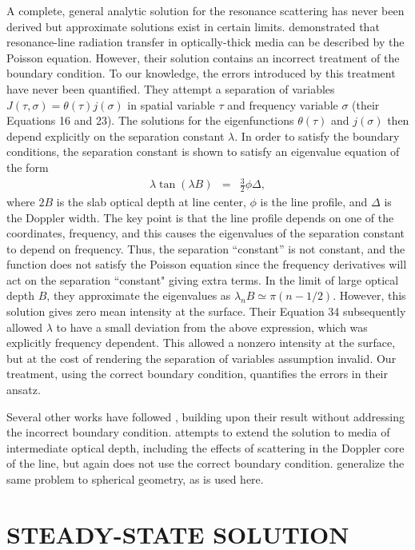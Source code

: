 \documentclass{aastex63}
\newcommand{\be}{\begin{eqnarray}}
\newcommand{\ee}{\end{eqnarray}}
\begin{document}
A complete, general analytic solution for the resonance scattering has never been derived but approximate solutions exist in certain limits. \citet{1973MNRAS.162...43H} demonstrated that resonance-line radiation transfer in optically-thick media can be described by the Poisson equation. However, their solution contains an incorrect treatment of the boundary condition. To our knowledge, the errors introduced by this treatment have never been quantified. They attempt a separation of variables $J(\tau,\sigma) = \theta(\tau) j(\sigma)$ in spatial variable $\tau$ and frequency variable $\sigma$ (their Equations 16 and 23). The solutions for the eigenfunctions $\theta(\tau)$ and $j(\sigma)$ then depend explicitly on the separation constant $\lambda$. In order to satisfy the boundary conditions, the separation constant is shown to satisfy an eigenvalue equation of the form
\be
\lambda \tan(\lambda B) & = & \frac{3}{2} \phi \Delta,
\label{eq:evalue}
\ee
where $2B$ is the slab optical depth at line center, $\phi$ is the line profile, and $\Delta$ is the Doppler width. The key point is that the line profile depends on one of the coordinates, frequency, and this causes the eigenvalues of the separation constant to depend on frequency. Thus, the separation ``constant'' is not constant, and the function does not satisfy the Poisson equation since the frequency derivatives will act on the separation ``constant" giving extra terms. In the limit of large optical depth $B$, they approximate the eigenvalues as $\lambda_n B \simeq \pi (n-1/2)$. However, this solution gives zero mean intensity at the surface. Their Equation 34 subsequently allowed $\lambda$ to have a small deviation from the above expression, which was explicitly frequency dependent. This allowed a nonzero intensity at the surface, but at the cost of rendering the separation of variables assumption invalid. Our treatment, using the correct boundary condition, quantifies the errors in their ansatz.

Several other works have followed \citet{1973MNRAS.162...43H}, building upon their result without addressing the incorrect boundary condition. \citet{1990ApJ...350..216N} attempts to extend the solution to media of intermediate optical depth, including the effects of scattering in the Doppler core of the line, but again does not use the correct boundary condition. \citet{2006ApJ...649...14D} generalize the same problem to spherical geometry, as is used here.

\section{STEADY-STATE SOLUTION}
\label{sec:steadystate}
\end{document}
